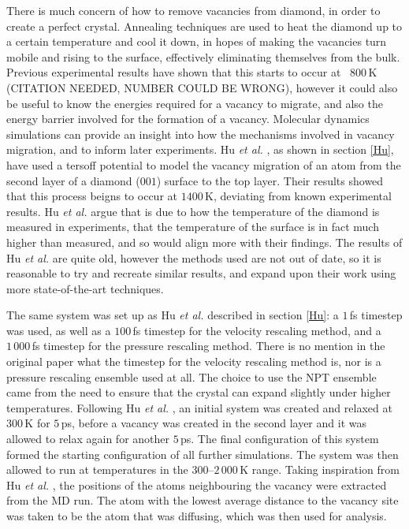 \documentclass[10pt,a4paper,twocolumn,twoside]{extarticle}
\newcommand{\al}{\emph{et al. }}
\begin{document}
There is much concern of how to remove vacancies from diamond, in order to create a perfect crystal. Annealing techniques are used to heat the diamond up to a certain temperature and cool it down, in hopes of making the vacancies turn mobile and rising to the surface, effectively eliminating themselves from the bulk. Previous experimental results have shown that this starts to occur at ~$800$\,K (CITATION NEEDED, NUMBER COULD BE WRONG), however it could also be useful to know the energies required for a vacancy to migrate, and also the energy barrier involved for the formation of a vacancy. Molecular dynamics simulations can provide an insight into how the mechanisms involved in vacancy migration, and to inform later experiments. Hu \al, as shown in section \ref{Hu}, have used a tersoff potential to model the vacancy migration of an atom from the second layer of a diamond ($001$) surface to the top layer. Their results showed that this process beigns to occur at $1400$\,K, deviating from known experimental results. Hu \al argue that is due to how the temperature of the diamond is measured in experiments, that the temperature of the surface is in fact much higher than measured, and so would align more with their findings. The results of Hu \al are quite old, however the methods used are not out of date, so it is reasonable to try and recreate similar results, and expand upon their work using more state-of-the-art techniques. 

The same system was set up as Hu \al described in section \ref{Hu}: a $1$\,fs timestep was used, as well as a $100$\,fs timestep for the velocity rescaling method, and a $1\,000$\,fs timestep for the pressure rescaling method. There is no mention in the original paper what the timestep for the velocity rescaling method is, nor is a pressure rescaling ensemble used at all. The choice to use the NPT ensemble came from the need to ensure that the crystal can expand slightly under higher temperatures. Following Hu \al, an initial system was created and relaxed at $300$\,K for $5$\,ps, before a vacancy was created in the second layer and it was allowed to relax again for another $5$\,ps. The final configuration of this system formed the starting configuration of all further simulations. The system was then allowed to run at temperatures in the $300$--$2\,000$\,K range. Taking inspiration from Hu \al, the positions of the atoms neighbouring the vacancy were extracted from the MD run. The atom with the lowest average distance to the vacancy site was taken to be the atom that was diffusing, which was then used for analysis. 
\end{document}

